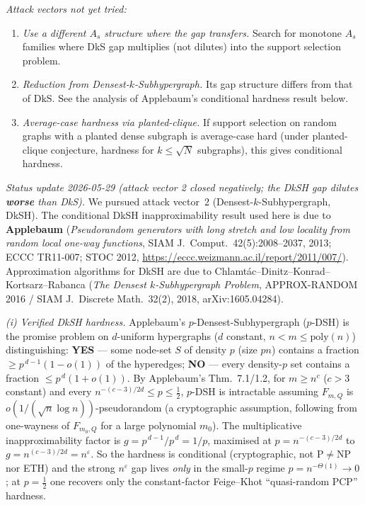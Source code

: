 \documentclass[
]{article}
\begin{document}
\emph{Attack vectors not yet tried:}
\begin{enumerate}
\item \emph{Use a different $A_s$ structure where the gap transfers.}
Search for monotone $A_s$ families where DkS gap multiplies (not
dilutes) into the support selection problem.
\item \emph{Reduction from Densest-$k$-Subhypergraph.}
Its gap structure differs from that of DkS. See the analysis of
Applebaum's conditional hardness result below.
\item \emph{Average-case hardness via planted-clique.} If support
selection on random graphs with a planted dense subgraph is
average-case hard (under planted-clique conjecture, hardness for
$k \leq \sqrt{N}$ subgraphs), this gives conditional hardness.
\end{enumerate}

\emph{Status update 2026-05-29 (attack vector 2 closed negatively;
the DkSH gap dilutes \textbf{worse} than DkS).}
We pursued attack vector~2 (Densest-$k$-Subhypergraph, DkSH).
The conditional DkSH inapproximability result used here is due to \textbf{Applebaum} (\emph{Pseudorandom
generators with long stretch and low locality from random local one-way
functions}, SIAM J.\ Comput.\ 42(5):2008--2037, 2013; ECCC TR11-007;
STOC 2012, \url{https://eccc.weizmann.ac.il/report/2011/007/}). Approximation algorithms for DkSH are due to
Chlamt\'ac--Dinitz--Konrad--Kortsarz--Rabanca (\emph{The Densest
$k$-Subhypergraph Problem}, APPROX-RANDOM 2016 / SIAM J.\ Discrete
Math.\ 32(2), 2018, arXiv:1605.04284).

\emph{(i) Verified DkSH hardness.} Applebaum's $p$-Densest-Subhypergraph
($p$-DSH) is the promise problem on $d$-uniform hypergraphs ($d$ constant,
$n<m\le\mathrm{poly}(n)$) distinguishing: \textbf{YES} --- some node-set
$S$ of density $p$ (size $pn$) contains a fraction
$\ge p^{\,d-1}(1-o(1))$ of the hyperedges; \textbf{NO} --- every density-$p$
set contains a fraction $\le p^{\,d}(1+o(1))$. By Applebaum's
Thm.\ 7.1/1.2, for $m\ge n^{c}$ ($c>3$ constant) and every
$n^{-(c-3)/2d}\le p\le \tfrac12$, $p$-DSH is intractable assuming
$F_{m,Q}$ is $o(1/(\sqrt n\log n))$-pseudorandom (a cryptographic
assumption, following from one-wayness of $F_{m_0,Q}$ for a large
polynomial $m_0$). The multiplicative inapproximability factor is
$g=p^{\,d-1}/p^{\,d}=1/p$, maximised at $p=n^{-(c-3)/2d}$ to
$g=n^{(c-3)/2d}=n^{\varepsilon}$. So the hardness is conditional
(cryptographic, not $\mathrm P\neq\mathrm{NP}$ nor ETH) and the strong
$n^{\varepsilon}$ gap lives \emph{only} in the small-$p$ regime
$p=n^{-\Theta(1)}\to 0$; at $p=\tfrac12$ one recovers only the
constant-factor Feige--Khot ``quasi-random PCP'' hardness.
\end{document}
